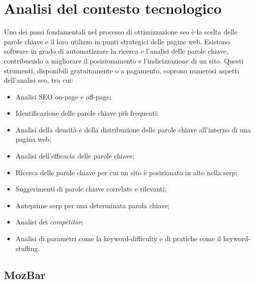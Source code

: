 \chapter{Analisi del contesto tecnologico}
\label{cap:analisi-soluzioni-esistenti}

Uno dei passi fondamentali nel processo di ottimizzazione \gls{seo} è la scelta delle parole chiave e il loro utilizzo in punti strategici delle pagine web. Esistono software in grado di automatizzare la ricerca e l'analisi delle parole chiave, contribuendo a migliorare il posizionamento e l'indicizzazione di un sito. Questi strumenti, disponibili gratuitamente o a pagamento, coprono numerosi aspetti dell'analisi \gls{seo}, tra cui:
\begin{itemize}
    \item Analisi SEO \gls{on-page} e \gls{off-page};
    \item Identificazione delle parole chiave più frequenti;
    \item Analisi della densità e della distribuzione delle parole chiave all'interno di una pagina web;
    \item Analisi dell'efficacia delle parole chiave;
    \item Ricerca delle parole chiave per cui un sito è posizionato in alto nella \gls{serp};
    \item Suggerimenti di parole chiave correlate e rilevanti;
    \item Anteprime \gls{serp} per una determinata parola chiave;
    \item Analisi dei \textit{competitor};
    \item Analisi di parametri come la \gls{keyword-difficulty} e di pratiche come il \gls{keyword-stuffing}.
\end{itemize}

\section{MozBar}


